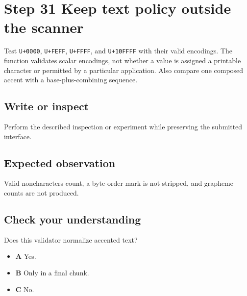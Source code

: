 \section{Step 31 Keep text policy outside the scanner}\label{utf8-s31}

Test \texttt{U+0000}, \texttt{U+FEFF}, \texttt{U+FFFF}, and \texttt{U+10FFFF} with their valid encodings. The function validates scalar encodings, not whether a value is assigned a printable character or permitted by a particular application. Also compare one composed accent with a base-plus-combining sequence.

\subsection{Write or inspect}
Perform the described inspection or experiment while preserving the submitted interface.

\subsection{Expected observation}
Valid noncharacters count, a byte-order mark is not stripped, and grapheme counts are not produced.

\subsection{Check your understanding}
Does this validator normalize accented text?

\begin{itemize}
  \item \textbf{A} Yes.
  \item \textbf{B} Only in a final chunk.
  \item \textbf{C} No.
\end{itemize}
